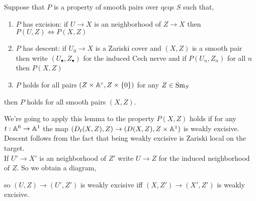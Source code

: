 \documentclass[12pt]{article}
\begin{document}
\begin{lemma}
Suppose that $P$ is a property of smooth pairs over qcqs $S$ such that,
\begin{enumerate}
\item $P$ has excision: if $U \to X$ is an \etale neighborhood of $Z \to X$ then $P(U, Z) \iff P(X, Z)$

\item $P$ has descent: if $U_0 \to X$ is a Zariski cover and $(X, Z)$ is a smooth pair then write $(U_\bullet, Z_\bullet)$ for the induced Cech nerve and if $P(U_n, Z_n)$ for all $n$ then $P(X, Z)$

\item $P$ holds for all pairs $(Z \times \mathbb{A}^c, Z \times \{ 0 \})$ for any $Z \in \mathrm{Sm}_S$ 
\end{enumerate}
then $P$ holds for all smooth pairs $(X, Z)$. 
\end{lemma}

\begin{rmk}
We're going to apply this lemma to the property $P(X, Z)$ holds if for any $t : \mathbb{A}^0 \to \mathbb{A}^1$ the map $(D_t(X, Z), Z) \to (D(X, Z), Z \times \mathbb{A}^1)$ is weakly excisive. Descent follows from the fact that being weakly excisive is Zariski local on the target. 
\bigskip\\
If $U' \to X'$ is an \etale neighborhood of $Z'$ write $U \to Z$ for the induced \etale neighborhood of $Z$. So we obtain a diagram,
\begin{center}
\end{center} 
so $(U, Z) \to (U', Z')$ is weakly excisive iff $(X, Z') \to (X', Z')$ is weakly excisive. 
\end{rmk}
\end{document}
